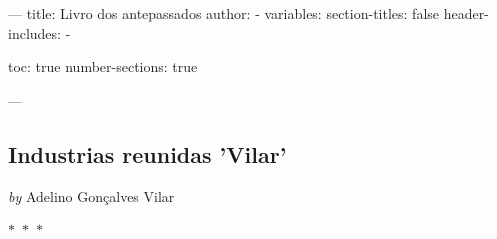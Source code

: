 
---
title: Livro dos antepassados
author:
- 
variables:
    section-titles: false
    header-includes: 
    - \usepackage{subcaption}




toc: true
number-sections: true

---
\newpage
{}


\begin{center}

    \section{  Industrias reunidas 'Vilar'  }

    
            
                \textit{by} Adelino Gonçalves Vilar
            
        

     
    
    

$\ast$~$\ast$~$\ast$



\end{center}

